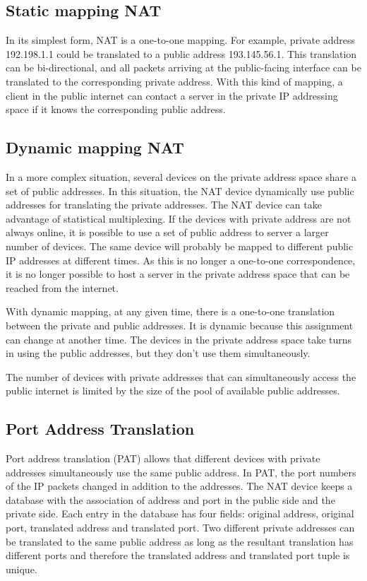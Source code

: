 \subsection{Static mapping NAT}
In its simplest form, NAT is a one-to-one mapping.
For example, private address 192.198.1.1 could be translated to a public address 193.145.56.1.
This translation can be bi-directional, and all packets arriving at the public-facing interface can be translated to the corresponding private address.
With this kind of mapping, a client in the public internet can contact a server in the private IP addressing space if it knows the corresponding public address.

\subsection{Dynamic mapping NAT}
In a more complex situation, several devices on the private address space share a set of public addresses.
In this situation, the NAT device dynamically use public addresses for translating the private addresses.
The NAT device can take advantage of statistical multiplexing.
If the devices with private address are not always online, it is possible to use a set of public address to server a larger number of devices.
The same device will probably be mapped to different public IP addresses at different times.
As this is no longer a one-to-one correspondence, it is no longer possible to host a server in the private address space that can be reached from the internet.

With dynamic mapping, at any given time, there is a one-to-one translation between the private and public addresses.
It is dynamic because this assignment can change at another time.
The devices in the private address space take turns in using the public addresses, but they don't use them simultaneously.

The number of devices with private addresses that can simultaneously access the public internet is limited by the size of the pool of available public addresses.

\subsection{Port Address Translation}

Port address translation (PAT) allows that different devices with private addresses simultaneously use the same public address.
In PAT, the port numbers of the IP packets changed in addition to the addresses.
The NAT device keeps a database with the association of address and port in the public side and the private side.
Each entry in the database has four fields: original address, original port, translated address and translated port.
Two different private addresses can be translated to the same public address as long as the resultant translation has different ports and therefore the translated address and translated port tuple is unique.

